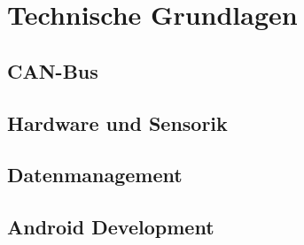 \section{Technische Grundlagen}
\label{sec:techngrund}

\subsection{CAN-Bus}




\subsection{Hardware und Sensorik}



\subsection{Datenmanagement}





\subsection{Android Development}


